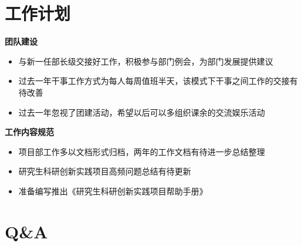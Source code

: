 \documentclass[10pt,aspectratio=43,mathserif]{beamer}
\begin{document}
\section{工作计划}

	\begin{frame}
		\begin{block}{\textbf{团队建设}}
			\begin{itemize}
				\item 与新一任部长级交接好工作，积极参与部门例会，为部门发展提供建议
				\item 过去一年干事工作方式为每人每周值班半天，该模式下干事之间工作的交接有待改善
				\item 过去一年忽视了团建活动，希望以后可以多组织课余的交流娱乐活动
			\end{itemize}
		\end{block}
		\begin{block}{\textbf{工作内容规范}}
			\begin{itemize}
				\item 项目部工作多以文档形式归档，两年的工作文档有待进一步总结整理
				\item 研究生科研创新实践项目高频问题总结有待更新
				\item 准备编写推出《研究生科研创新实践项目帮助手册》
			\end{itemize}
		\end{block}
	\end{frame}

\section{Q\&A}
	\begin{frame}
		\begin{center} \fontsize{28pt}{28pt}\selectfont {谢谢！}
		\end{center}
	\end{frame}
\end{document}
